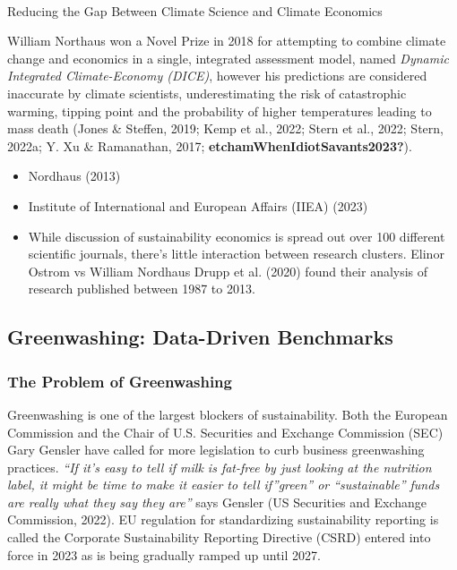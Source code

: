 \documentclass[
  letterpaper,
  DIV=11,
  numbers=noendperiod]{scrartcl}
\makeatletter
\let\oldparagraph\paragraph
\renewcommand{\paragraph}{
    \@ifstar
      \xxxParagraphStar
      \xxxParagraphNoStar
  }
\newcommand{\xxxParagraphStar}[1]{\oldparagraph*{#1}\mbox{}}
\newcommand{\xxxParagraphNoStar}[1]{\oldparagraph{#1}\mbox{}}
\providecommand{\tightlist}{%
  \setlength{\itemsep}{0pt}\setlength{\parskip}{0pt}}\usepackage{longtable,booktabs,array}
\makeatother
\begin{document}
\paragraph{Reducing the Gap Between Climate Science and Climate
Economics}\label{reducing-the-gap-between-climate-science-and-climate-economics}

William Northaus won a Novel Prize in 2018 for attempting to combine
climate change and economics in a single, integrated assessment model,
named \emph{Dynamic Integrated Climate-Economy (DICE)}, however his
predictions are considered inaccurate by climate scientists,
underestimating the risk of catastrophic warming, tipping point and the
probability of higher temperatures leading to mass death (Jones \&
Steffen, 2019; Kemp et al., 2022; Stern et al., 2022; Stern, 2022a; Y.
Xu \& Ramanathan, 2017; \textbf{etchamWhenIdiotSavants2023?}).

\begin{itemize}
\tightlist
\item
  Nordhaus (2013)
\item
  Institute of International and European Affairs (IIEA) (2023)
\item
  While discussion of sustainability economics is spread out over 100
  different scientific journals, there's little interaction between
  research clusters. Elinor Ostrom vs William Nordhaus Drupp et al.
  (2020) found their analysis of research published between 1987 to
  2013.
\end{itemize}

\subsection{Greenwashing: Data-Driven
Benchmarks}\label{greenwashing-data-driven-benchmarks}

\subsubsection{The Problem of
Greenwashing}\label{the-problem-of-greenwashing}

Greenwashing is one of the largest blockers of sustainability. Both the
European Commission and the Chair of U.S. Securities and Exchange
Commission (SEC) Gary Gensler have called for more legislation to curb
business greenwashing practices. \emph{``If it's easy to tell if milk is
fat-free by just looking at the nutrition label, it might be time to
make it easier to tell if''green'' or ``sustainable'' funds are really
what they say they are''} says Gensler (US Securities and Exchange
Commission, 2022). EU regulation for standardizing sustainability
reporting is called the Corporate Sustainability Reporting Directive
(CSRD) entered into force in 2023 as is being gradually ramped up until
2027.
\end{document}
